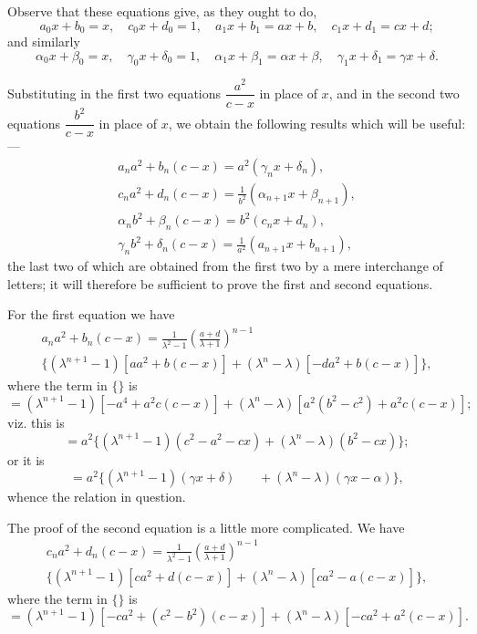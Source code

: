 \documentclass[11pt,a4paper]{book}
\begin{document}
Observe that these equations give, as they ought to do,
\[
a_0 x + b_0 = x,\quad c_0 x + d_0 = 1,\quad a_1 x + b_1 = ax+b,\quad c_1 x + d_1 = cx+d;
\]
and similarly
\[
\alpha_0 x + \beta_0 = x,\quad \gamma_0 x + \delta_0 = 1,\quad 
\alpha_1 x + \beta_1 = \alpha x+\beta,\quad \gamma_1 x + \delta_1 = \gamma x+\delta.
\]

Substituting in the first two equations $\dfrac{a^2}{c-x}$ in place of $x$, and in the second two equations $\dfrac{b^2}{c-x}$ in place of $x$, we obtain the following results which will be useful:---
\begin{gather*}
a_n a^2 + b_n(c-x) = a^2(\gamma_n x + \delta_n),\\
c_n a^2 + d_n(c-x) = \frac{1}{b^2}(\alpha_{n+1} x + \beta_{n+1}),\\
\alpha_n b^2 + \beta_n(c-x) = b^2(c_n x + d_n),\\
\gamma_n b^2 + \delta_n(c-x) = \frac{1}{a^2}(a_{n+1} x + b_{n+1}),
\end{gather*}
the last two of which are obtained from the first two by a mere interchange of letters; it will therefore be sufficient to prove the first and second equations.

For the first equation we have
\begin{multline*}
a_n a^2 + b_n(c-x) = \frac{1}{\lambda^2-1}\left(\frac{a+d}{\lambda+1}\right)^{n-1}\\
\{ (\lambda^{n+1}-1)[aa^2 + b(c-x)] + (\lambda^n-\lambda)[-da^2 + b(c-x)] \},
\end{multline*}
where the term in $\{\}$ is
\[
= (\lambda^{n+1}-1)[-a^4 + a^2c(c-x)] + (\lambda^n-\lambda)[a^2(b^2-c^2) + a^2c(c-x)];
\]
viz. this is
\[
= a^2 \{ (\lambda^{n+1}-1)(c^2-a^2-cx) + (\lambda^n-\lambda)(b^2-cx) \};
\]
or it is
\[
= a^2 \{ (\lambda^{n+1}-1)(\gamma x + \delta) \phantom{mm} + (\lambda^n-\lambda)(\gamma x - \alpha) \},
\]
whence the relation in question.

The proof of the second equation is a little more complicated. We have
\begin{multline*}
c_n a^2 + d_n(c-x) = \frac{1}{\lambda^2-1}\left(\frac{a+d}{\lambda+1}\right)^{n-1}\\
\{ (\lambda^{n+1}-1)[ca^2 + d(c-x)] + (\lambda^n-\lambda)[ca^2 - a(c-x)] \},
\end{multline*}
where the term in $\{\}$ is
\[
= (\lambda^{n+1}-1)[-ca^2 + (c^2-b^2)(c-x)] + (\lambda^n-\lambda)[-ca^2 + a^2(c-x)].
\]
\end{document}
